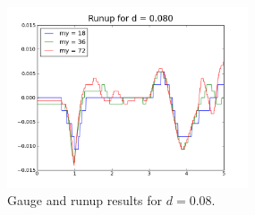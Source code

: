 \begin{figure}[ht]
\vskip 10pt
\hfil\includegraphics[width=2.8in]{bp3/runup-d0-08.png}\hfil

\caption{\label{fig:bp3gauge2} 
Gauge and runup results for $d=0.08$.
  }
\end{figure}



\begin{figure}[ht]


\end{figure}
